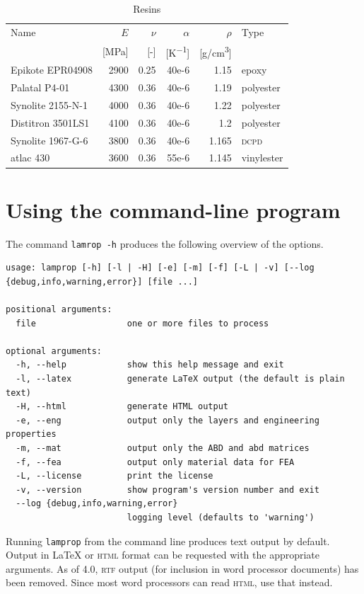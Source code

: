\documentclass[a4paper,landscape,oneside,11pt,twocolumn]{memoir}
\begin{document}
\begin{table}[!htbp]
  \centering
  \caption{\label{tb:resins}Resins}
  \begin{tabular}{lrrrrl}%
      Name & $E$ & $\nu$ & $\alpha$ & $\rho$ & Type\\
      & [\si{MPa}] & [-] & [\si{K^{-1}}] & [\si{g/cm^3}]\\
    \midrule
      Epikote EPR04908 & 2900 & 0.25 & 40e-6 & 1.15 & epoxy\\
      Palatal P4-01 & 4300 & 0.36 & 40e-6 & 1.19 & polyester\\
      Synolite 2155-N-1 & 4000 & 0.36 & 40e-6 & 1.22 & polyester\\
      Distitron 3501LS1 & 4100 & 0.36 & 40e-6 & 1.2 & polyester\\
      Synolite 1967-G-6 & 3800 & 0.36 & 40e-6 & 1.165 & \textsc{dcpd}\\
      atlac 430 & 3600 & 0.36 & 55e-6 & 1.145 & vinylester\\
  \end{tabular}
\end{table}

\section{Using the command-line program} %

The command \texttt{lamrop -h} produces the following overview of the options.

\begin{lstlisting}[style=plain]
usage: lamprop [-h] [-l | -H] [-e] [-m] [-f] [-L | -v] [--log {debug,info,warning,error}] [file ...]

positional arguments:
  file                  one or more files to process

optional arguments:
  -h, --help            show this help message and exit
  -l, --latex           generate LaTeX output (the default is plain text)
  -H, --html            generate HTML output
  -e, --eng             output only the layers and engineering properties
  -m, --mat             output only the ABD and abd matrices
  -f, --fea             output only material data for FEA
  -L, --license         print the license
  -v, --version         show program's version number and exit
  --log {debug,info,warning,error}
                        logging level (defaults to 'warning')
\end{lstlisting}

Running \texttt{lamprop} from the command line produces text output by
default. Output in \LaTeX{} or \textsc{html} format can be requested with the
appropriate arguments. As of 4.0, \textsc{rtf} output (for inclusion in word
processor documents) has been removed. Since most word processors can read
\textsc{html}, use that instead.
\end{document}
